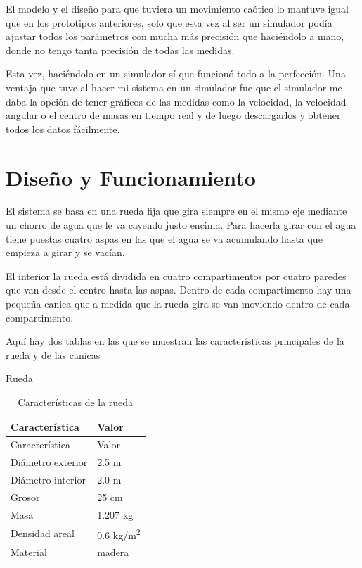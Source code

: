 \documentclass[
  10pt,
  a4paper,
  DIV=11,
  numbers=noendperiod,
  open=any]{scrreprt}
\numberwithin{equation}{chapter}
\numberwithin{equation}{section}
\renewcommand{\[}{\begin{equation}}
\renewcommand{\]}{\end{equation}}
\begin{document}
El modelo y el diseño para que tuviera un movimiento caótico lo mantuve
igual que en los prototipos anteriores, solo que esta vez al ser un
simulador podía ajustar todos los parámetros con mucha más precisión que
haciéndolo a mano, donde no tengo tanta precisión de todas las medidas.

Esta vez, haciéndolo en un simulador sí que funcionó todo a la
perfección. Una ventaja que tuve al hacer mi sistema en un simulador fue
que el simulador me daba la opción de tener gráficos de las medidas como
la velocidad, la velocidad angular o el centro de masas en tiempo real y
de luego descargarlos y obtener todos los datos fácilmente.

\section{Diseño y Funcionamiento}\label{diseuxf1o-y-funcionamiento}

El sistema se basa en una rueda fija que gira siempre en el mismo eje
mediante un chorro de agua que le va cayendo justo encima. Para hacerla
girar con el agua tiene puestas cuatro aspas en las que el agua se va
acumulando hasta que empieza a girar y se vacían.

El interior la rueda está dividida en cuatro compartimentos por cuatro
paredes que van desde el centro hasta las aspas. Dentro de cada
compartimento hay una pequeña canica que a medida que la rueda gira se
van moviendo dentro de cada compartimento.

Aquí hay dos tablas en las que se muestran las características
principales de la rueda y de las canicas

Rueda
\begin{longtable}{@{}ll@{}}
\caption{Características de la rueda}\label{tab:rueda}\\
\toprule
Característica & Valor\\
\midrule
\endfirsthead
\toprule
Característica & Valor\\
\midrule
\endhead
\bottomrule
\endfoot
\bottomrule
\endlastfoot
Diámetro exterior & 2.5 m\\
Diámetro interior & 2.0 m\\
Grosor            & 25 cm\\
Masa              & 1.207 kg\\
Densidad areal    & 0.6 kg/m\textsuperscript{2}\\
Material          & madera\\
\end{longtable}
\end{document}
